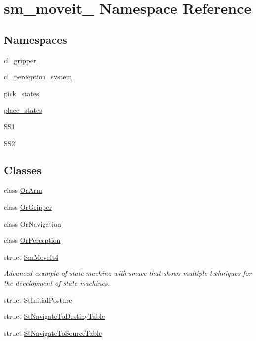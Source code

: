 \hypertarget{namespacesm__moveit__4}{}\section{sm\+\_\+moveit\+\_ Namespace Reference}
\label{namespacesm__moveit__4}
\subsection*{Namespaces}
\begin{DoxyCompactItemize}
\item 
 \hyperlink{namespacesm__moveit__4_1_1cl__gripper}{cl\+\_\+gripper}
\item 
 \hyperlink{namespacesm__moveit__4_1_1cl__perception__system}{cl\+\_\+perception\+\_\+system}
\item 
 \hyperlink{namespacesm__moveit__4_1_1pick__states}{pick\+\_\+states}
\item 
 \hyperlink{namespacesm__moveit__4_1_1place__states}{place\+\_\+states}
\item 
 \hyperlink{namespacesm__moveit__4_1_1SS1}{S\+S1}
\item 
 \hyperlink{namespacesm__moveit__4_1_1SS2}{S\+S2}
\end{DoxyCompactItemize}
\subsection*{Classes}
\begin{DoxyCompactItemize}
\item 
class \hyperlink{classsm__moveit__4_1_1OrArm}{Or\+Arm}
\item 
class \hyperlink{classsm__moveit__4_1_1OrGripper}{Or\+Gripper}
\item 
class \hyperlink{classsm__moveit__4_1_1OrNavigation}{Or\+Navigation}
\item 
class \hyperlink{classsm__moveit__4_1_1OrPerception}{Or\+Perception}
\item 
struct \hyperlink{structsm__moveit__4_1_1SmMoveIt4}{Sm\+Move\+It4}
\begin{DoxyCompactList}\small\item\em Advanced example of state machine with smacc that shows multiple techniques for the development of state machines. \end{DoxyCompactList}\item 
struct \hyperlink{structsm__moveit__4_1_1StInitialPosture}{St\+Initial\+Posture}
\item 
struct \hyperlink{structsm__moveit__4_1_1StNavigateToDestinyTable}{St\+Navigate\+To\+Destiny\+Table}
\item 
struct \hyperlink{structsm__moveit__4_1_1StNavigateToSourceTable}{St\+Navigate\+To\+Source\+Table}
\end{DoxyCompactItemize}
